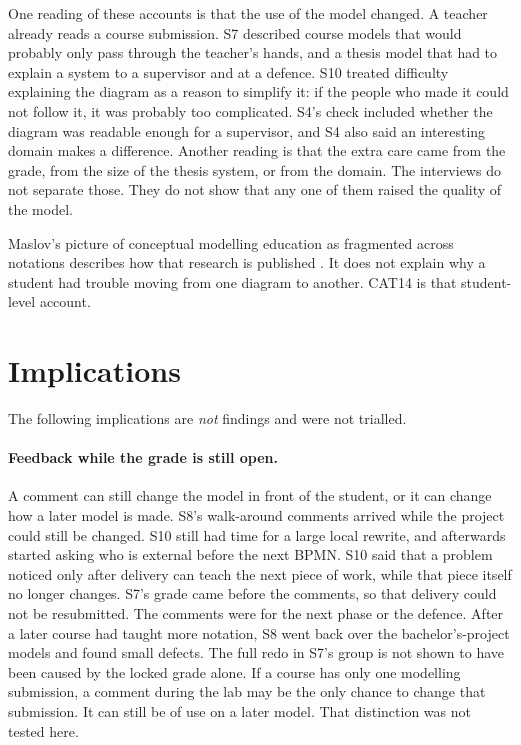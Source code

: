 One reading of these accounts is that the use of the model changed. A teacher already reads a course submission. S7 described course models that would probably only pass through the teacher's hands, and a thesis model that had to explain a system to a supervisor and at a defence. S10 treated difficulty explaining the diagram as a reason to simplify it: if the people who made it could not follow it, it was probably too complicated. S4's check included whether the diagram was readable enough for a supervisor, and S4 also said an interesting domain makes a difference. Another reading is that the extra care came from the grade, from the size of the thesis system, or from the domain. The interviews do not separate those. They do not show that any one of them raised the quality of the model.

Maslov's picture of conceptual modelling education as fragmented across notations describes how that research is published \cite{maslov2025conceptual}. It does not explain why a student had trouble moving from one diagram to another. CAT14 is that student-level account.

\section{Implications}
\label{sec:disc_implications}

The following implications are \emph{not} findings and were not trialled.

\paragraph{Feedback while the grade is still open.}
A comment can still change the model in front of the student, or it can change how a later model is made. S8's walk-around comments arrived while the project could still be changed. S10 still had time for a large local rewrite, and afterwards started asking who is external before the next BPMN. S10 said that a problem noticed only after delivery can teach the next piece of work, while that piece itself no longer changes. S7's grade came before the comments, so that delivery could not be resubmitted. The comments were for the next phase or the defence. After a later course had taught more notation, S8 went back over the bachelor's-project models and found small defects. The full redo in S7's group is not shown to have been caused by the locked grade alone. If a course has only one modelling submission, a comment during the lab may be the only chance to change that submission. It can still be of use on a later model. That distinction was not tested here.

